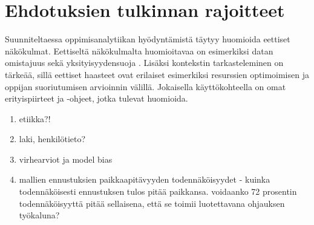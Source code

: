 \color{black}

\color{red}
\section{Ehdotuksien tulkinnan rajoitteet}

Suunniteltaessa oppimisanalytiikan hyödyntämistä täytyy huomioida eettiset näkökulmat. Eettiseltä näkökulmalta huomioitavaa on esimerkiksi datan omistajuus sekä yksityisyydensuoja \citep{sladeLearningAnalyticsEthical2013}. Lisäksi kontekstin tarkasteleminen on tärkeää, sillä eettiset haasteet ovat erilaiset esimerkiksi resurssien optimoimisen ja oppijan suoriutumisen arvioinnin välillä. Jokaisella käyttökohteella on omat erityispiirteet ja -ohjeet, jotka tulevat huomioida.

\begin{enumerate}
    \item etiikka?! \citep{kailaEthicalConsiderationsLearning2019}
    \item laki, henkilötieto? \citep{hannulaOppijanDigitaalinenJalanjalki2017}
    \item virhearviot ja model bias
    \item mallien ennustuksien paikkaapitävyyden todennäköisyydet - kuinka todennäköisesti ennustuksen tulos pitää paikkansa. voidaanko 72 prosentin todennäköisyyttä pitää sellaisena, että se toimii luotettavana ohjauksen työkaluna?
\end{enumerate}
